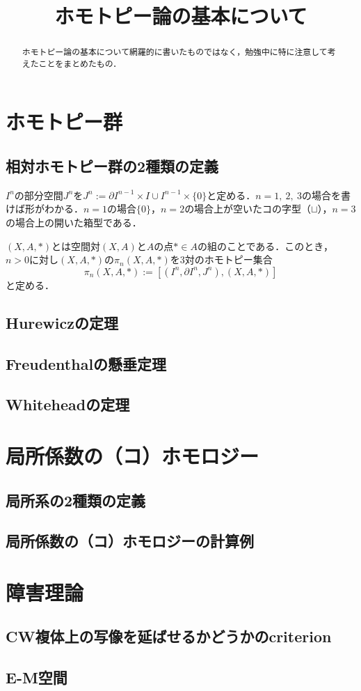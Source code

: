 \documentclass[a4paper,11pt]{jsarticle}
\begin{document}
\title{ホモトピー論の基本について}
\maketitle
\begin{abstract}
  ホモトピー論の基本について網羅的に書いたものではなく，勉強中に特に注意して考えたことをまとめたもの．
\end{abstract}
\tableofcontents
\section{ホモトピー群}
\subsection{相対ホモトピー群の2種類の定義}
$I^n$の部分空間$J^n$を$J^n:=\partial I^{n-1}\times I\cup I^{n-1}\times\{0\}$と定める．$n=1,\ 2,\ 3$の場合を書けば形がわかる．$n=1$の場合$\{0\}$，$n=2$の場合上が空いたコの字型（$\sqcup$），$n=3$の場合上の開いた箱型である．

$(X,A,*)$とは空間対$(X,A)$と$A$の点$*\in A$の組のことである．このとき，$n>0$に対し$(X,A,*)$の$\pi_n(X,A,*)$を3対のホモトピー集合\[
  \pi_n(X,A,*):=[(I^n,\partial I^n,J^n),(X,A,*)]
\]と定める．
\subsection{Hurewiczの定理}
\subsection{Freudenthalの懸垂定理}
\subsection{Whiteheadの定理}
\section{局所係数の（コ）ホモロジー}
\subsection{局所系の2種類の定義}
\subsection{局所係数の（コ）ホモロジーの計算例}
\section{障害理論}
\subsection{CW複体上の写像を延ばせるかどうかのcriterion}
\subsection{E-M空間}

\printindex
\end{document}
